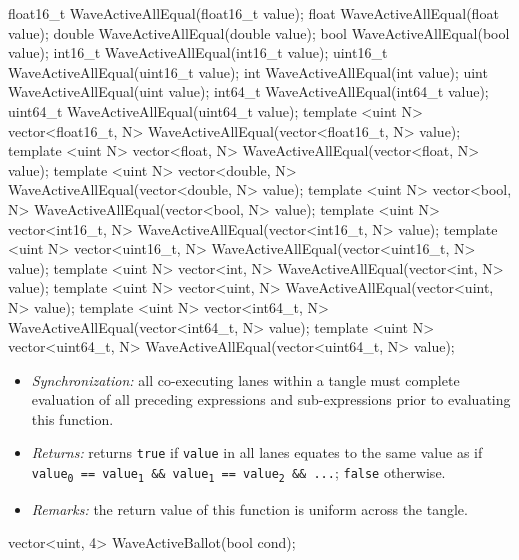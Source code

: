 \begin{HLSL}
float16_t WaveActiveAllEqual(float16_t value);
float WaveActiveAllEqual(float value);
double WaveActiveAllEqual(double value);
bool WaveActiveAllEqual(bool value);
int16_t WaveActiveAllEqual(int16_t value);
uint16_t WaveActiveAllEqual(uint16_t value);
int WaveActiveAllEqual(int value);
uint WaveActiveAllEqual(uint value);
int64_t WaveActiveAllEqual(int64_t value);
uint64_t WaveActiveAllEqual(uint64_t value);
template <uint N> vector<float16_t, N> WaveActiveAllEqual(vector<float16_t, N> value);
template <uint N> vector<float, N> WaveActiveAllEqual(vector<float, N> value);
template <uint N> vector<double, N> WaveActiveAllEqual(vector<double, N> value);
template <uint N> vector<bool, N> WaveActiveAllEqual(vector<bool, N> value);
template <uint N> vector<int16_t, N> WaveActiveAllEqual(vector<int16_t, N> value);
template <uint N> vector<uint16_t, N> WaveActiveAllEqual(vector<uint16_t, N> value);
template <uint N> vector<int, N> WaveActiveAllEqual(vector<int, N> value);
template <uint N> vector<uint, N> WaveActiveAllEqual(vector<uint, N> value);
template <uint N> vector<int64_t, N> WaveActiveAllEqual(vector<int64_t, N> value);
template <uint N> vector<uint64_t, N> WaveActiveAllEqual(vector<uint64_t, N> value);
\end{HLSL}

\begin{itemize}
  \item \textit{Synchronization:} all co-executing \gls{lane}s within a \gls{tangle}
  must complete evaluation of all preceding expressions and sub-expressions
  prior to evaluating this function.
  \item \textit{Returns:} returns \texttt{true} if \texttt{value} in all \gls{lane}s
  equates to the same value as if \texttt{value\textsubscript{0} ==
  value\textsubscript{1} \&\& value\textsubscript{1} == value\textsubscript{2}
  \&\& ...}; \texttt{false} otherwise.
  \item \textit{Remarks:} the return value of this function is uniform across
  the \gls{tangle}.
\end{itemize}

\begin{HLSL}
vector<uint, 4> WaveActiveBallot(bool cond);
\end{HLSL}

